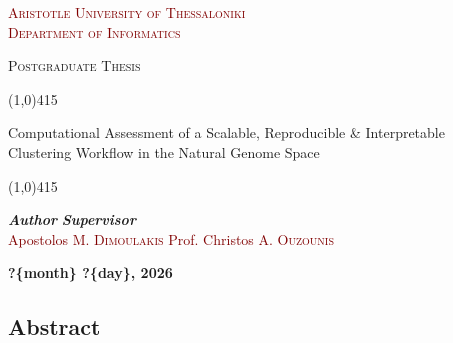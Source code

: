 \documentclass[a4paper,12pt]{extarticle}
\begin{document}
  \pagestyle{plain}  %


  \begin{titlepage}
    \begin{center}
      \vspace*{1cm}  %

      \Large{\textsc{\textcolor{maroon}{Aristotle University of
Thessaloniki\\Department of Informatics}}}

      \vspace{1.5cm}

      \Large{\textsc{Postgraduate Thesis}}

      \vspace{1cm}

      \line(1,0){415}
      \vspace{5.5mm}
      {\fontsize{20.74}{24}\selectfont\bfseries
        \parbox{415pt}{\centering Computational Assessment of a Scalable, Reproducible \& Interpretable Clustering Workflow in the Natural Genome Space}
      }

      \vspace{2mm}
      \line(1,0){415}
    \end{center}
    \vspace{3cm}
    \begin{minipage}{\textwidth}
      \large{\textbf{\textit{Author}}}
      \hfill
      \large{\textbf{\textit{Supervisor}}}
      \\
      \textcolor{maroon}{\large{Apostolos M. \textsc{Dimoulakis}}}
      \hfill
      \textcolor{maroon}{\large{Prof. Christos A. \textsc{Ouzounis}}}
    \end{minipage}

    \vspace{\fill}

    \begin{center}
      \textbf{\large{?\{month\} ?\{day\}, 2026}}
    \end{center}
  \end{titlepage}
  

  
  \pagestyle{headerpage}
  
  \subsection*{%
    \center Abstract
  }
  
\end{document}
